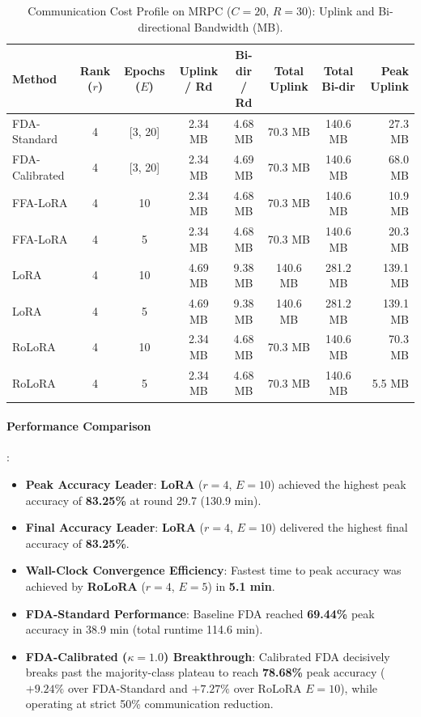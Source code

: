 \documentclass[10pt,a4paper]{article}
\begin{document}
\begin{table}[H]
\centering
\caption{Communication Cost Profile on MRPC ($C=20$, $R=30$): Uplink and Bi-directional Bandwidth (MB).}
\scriptsize
\setlength{\tabcolsep}{4.0pt}
\begin{tabular*}{\textwidth}{@{\extracolsep{\fill}}lccccccr@{}}
\toprule
\textbf{Method} & \textbf{Rank ($r$)} & \textbf{Epochs ($E$)} & \textbf{Uplink / Rd} & \textbf{Bi-dir / Rd} & \textbf{Total Uplink} & \textbf{Total Bi-dir} & \textbf{Peak Uplink} \\
\midrule
FDA-Standard & 4 & [3, 20] & 2.34 MB & 4.68 MB & 70.3 MB & 140.6 MB & 27.3 MB \\
FDA-Calibrated & 4 & [3, 20] & 2.34 MB & 4.69 MB & 70.3 MB & 140.6 MB & 68.0 MB \\
FFA-LoRA & 4 & 10 & 2.34 MB & 4.68 MB & 70.3 MB & 140.6 MB & 10.9 MB \\
FFA-LoRA & 4 & 5 & 2.34 MB & 4.68 MB & 70.3 MB & 140.6 MB & 20.3 MB \\
LoRA & 4 & 10 & 4.69 MB & 9.38 MB & 140.6 MB & 281.2 MB & 139.1 MB \\
LoRA & 4 & 5 & 4.69 MB & 9.38 MB & 140.6 MB & 281.2 MB & 139.1 MB \\
RoLoRA & 4 & 10 & 2.34 MB & 4.68 MB & 70.3 MB & 140.6 MB & 70.3 MB \\
RoLoRA & 4 & 5 & 2.34 MB & 4.68 MB & 70.3 MB & 140.6 MB & 5.5 MB \\
\bottomrule
\end{tabular*}
\end{table}

\paragraph{Performance Comparison}:
\begin{itemize}
    \item \textbf{Peak Accuracy Leader}: \textbf{LoRA} ($r=4$, $E=10$) achieved the highest peak accuracy of \textbf{83.25\%} at round 29.7 (130.9 min).
    \item \textbf{Final Accuracy Leader}: \textbf{LoRA} ($r=4$, $E=10$) delivered the highest final accuracy of \textbf{83.25\%}.
    \item \textbf{Wall-Clock Convergence Efficiency}: Fastest time to peak accuracy was achieved by \textbf{RoLoRA} ($r=4$, $E=5$) in \textbf{5.1 min}.
    \item \textbf{FDA-Standard Performance}: Baseline FDA reached \textbf{69.44\%} peak accuracy in 38.9 min (total runtime 114.6 min).
    \item \textbf{FDA-Calibrated ($\kappa=1.0$) Breakthrough}: Calibrated FDA decisively breaks past the majority-class plateau to reach \textbf{78.68\%} peak accuracy ($+9.24\%$ over FDA-Standard and $+7.27\%$ over RoLoRA $E=10$), while operating at strict 50\% communication reduction.
\end{itemize}
\end{document}
